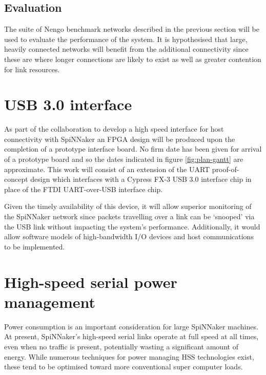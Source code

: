 		\subsection{Evaluation}
			
			The suite of Nengo benchmark networks described in the previous section
			will be used to evaluate the performance of the system. It is hypothesised
			that large, heavily connected networks will benefit from the additional
			connectivity since these are where longer connections are likely to exist
			as well as greater contention for link resources.
	
	
	\section{USB 3.0 interface}
		
		As part of the collaboration to develop a high speed interface for host
		connectivity with SpiNNaker an FPGA design will be produced upon the
		completion of a prototype interface board. No firm date has been given for
		arrival of a prototype board and so the dates indicated in figure
		\ref{fig:plan-gantt} are approximate. This work will consist of an extension
		of the UART proof-of-concept design which interfaces with a Cypress FX-3 USB
		3.0 interface chip in place of the FTDI UART-over-USB interface chip.
		
		Given the timely availability of this device, it will allow superior
		monitoring of the SpiNNaker network since packets travelling over a link can
		be `snooped' via the USB link without impacting the system's performance.
		Additionally, it would allow software models of high-bandwidth I/O devices
		and host communications to be implemented.
	
	
	\section{High-speed serial power management}
		
		
		Power consumption is an important consideration for large SpiNNaker
		machines. At present, SpiNNaker's high-speed serial links operate at full
		speed at all times, even when no traffic is present, potentially wasting a
		significant amount of energy. While numerous techniques for power managing
		HSS technologies exist, these tend to be optimised toward more conventional
		super computer loads.
		
